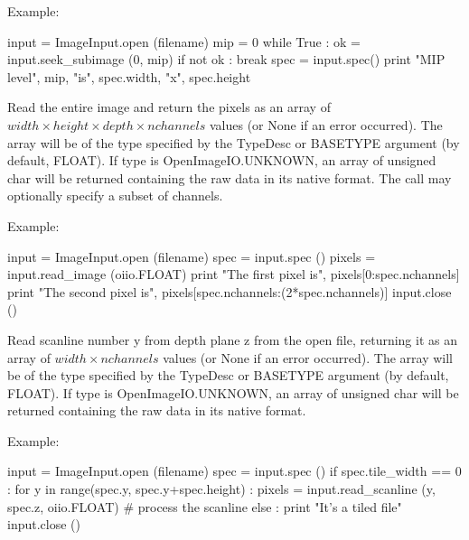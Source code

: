 \noindent Example:
\begin{code}
    input = ImageInput.open (filename)
    mip = 0
    while True :
        ok = input.seek_subimage (0, mip)
        if not ok :
            break
        spec = input.spec()
        print "MIP level", mip, "is", spec.width, "x", spec.height
\end{code}
\apiend

Read the entire image and return the pixels as an array of
$\mathit{width} \times \mathit{height} \times \mathit{depth} \times \mathit{nchannels}$
values (or {\cf None} if an error occurred). The array will be of the type
specified by the {\cf TypeDesc} or {\cf BASETYPE} argument (by default,
{\cf FLOAT}). If {\cf type} is {\cf OpenImageIO.UNKNOWN}, an
array of {\cf unsigned char} will be returned containing the raw data in
its native format. The call may optionally specify a subset of channels.

\noindent Example:
\begin{code}
    input = ImageInput.open (filename)
    spec = input.spec ()
    pixels = input.read_image (oiio.FLOAT)
    print "The first pixel is", pixels[0:spec.nchannels]
    print "The second pixel is", pixels[spec.nchannels:(2*spec.nchannels)]
    input.close ()
\end{code}
\apiend

Read scanline number {\cf y} from depth plane {\cf z} from the open file,
returning it as an array of $\mathit{width} \times \mathit{nchannels}$
values (or {\cf None} if an error occurred). The array will be of the type
specified by the {\cf TypeDesc} or {\cf BASETYPE} argument (by default,
{\cf FLOAT}). If {\cf type} is {\cf OpenImageIO.UNKNOWN}, an
array of {\cf unsigned char} will be returned containing the raw data in
its native format.

\noindent Example:
\begin{code}
    input = ImageInput.open (filename)
    spec = input.spec ()
    if spec.tile_width == 0 :
        for y in range(spec.y, spec.y+spec.height) :
            pixels = input.read_scanline (y, spec.z, oiio.FLOAT)
            # process the scanline
    else :
        print "It's a tiled file"
    input.close ()
\end{code}
\apiend

